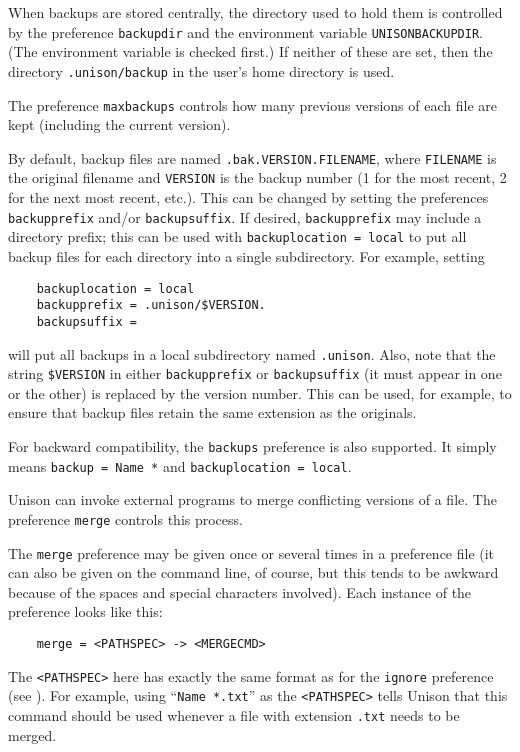 \documentclass{article}
\begin{document}
When backups are stored centrally, the directory used to hold them is
controlled by the preference \verb|backupdir| and the
environment variable \verb|UNISONBACKUPDIR|.  (The environment variable is
checked first.)  If neither of these are set, then the directory
\verb|.unison/backup| in the user's home directory is used.

The preference \verb|maxbackups| controls how many previous versions of
each file are kept (including the current version).

By default, backup files are named \verb|.bak.VERSION.FILENAME|,
where \verb|FILENAME| is the original filename and \verb|VERSION| is the
backup number (1 for the most recent, 2 for the next most recent,
etc.).  This can be changed by setting the preferences \verb|backupprefix|
and/or \verb|backupsuffix|.  If desired, \verb|backupprefix| may include a
directory prefix; this can be used with \verb|backuplocation = local| to put all
backup files for each directory into a single subdirectory.  For example, setting
\begin{verbatim}
    backuplocation = local
    backupprefix = .unison/$VERSION.
    backupsuffix =
\end{verbatim}
will put all backups in a local subdirectory named \verb|.unison|.  Also,
note that the string \verb|$VERSION| in either \verb|backupprefix| or
\verb|backupsuffix| (it must appear in one or the other) is replaced by
the version number.  This can be used, for example, to ensure that backup
files retain the same extension as the originals.

For backward compatibility, the \verb|backups| preference is also supported.
%
It simply means \verb|backup = Name *| and \verb|backuplocation = local|.



Unison can invoke external programs to merge conflicting versions of a file.
The preference \verb|merge| controls this process.

The \verb|merge| preference may be given once or several times in a
preference file (it can also be given on the command line, of course, but
this tends to be awkward because of the spaces and special characters
involved).  Each instance of the preference looks like this:
\begin{verbatim}
    merge = <PATHSPEC> -> <MERGECMD>
\end{verbatim}
The \verb|<PATHSPEC>| here has exactly the same format as for the
\verb|ignore| preference (see ).  For example,
using ``\verb|Name *.txt|'' as the \verb|<PATHSPEC>| tells Unison that this
command should be used whenever a file with extension \verb|.txt| needs to
be merged.
\end{document}

